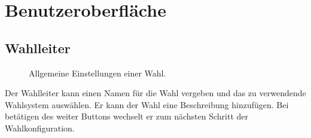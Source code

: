 \documentclass[parskip=full,11pt,twoside]{scrartcl}
\begin{document}
\section{Benutzeroberfläche}

\subsection{Wahlleiter}

\begin{figure}[H]
	\caption{\label{fig:wlltr-general}
		Allgemeine Einstellungen einer Wahl.
	}
\end{figure}
Der Wahlleiter kann einen Namen für die Wahl vergeben und das zu verwendende Wahlsystem auswählen.
Er kann der Wahl eine Beschreibung hinzufügen.
Bei betätigen des weiter Buttons wechselt er zum nächsten Schritt der Wahlkonfiguration.
\end{document}

